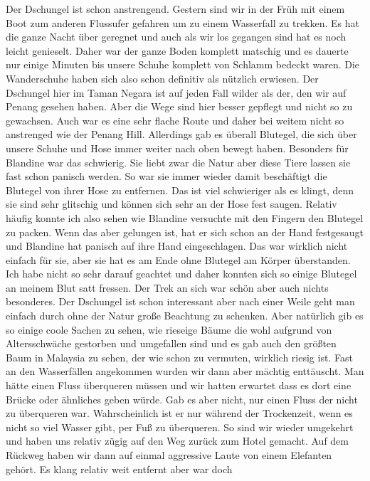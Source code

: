 \documentclass[11pt]{book}
\begin{document}
Der Dschungel ist schon anstrengend. Gestern sind wir in der Früh mit einem Boot zum anderen Flussufer gefahren um zu einem Wasserfall 
zu trekken. Es hat die ganze Nacht über geregnet und auch als wir los gegangen sind hat es noch leicht genieselt. Daher war der ganze 
Boden komplett matschig und es dauerte nur einige Minuten bis unsere Schuhe komplett von Schlamm bedeckt waren. Die Wanderschuhe 
haben sich also schon definitiv als nützlich erwiesen. Der Dschungel hier im Taman Negara ist auf jeden Fall wilder als der, den
wir auf Penang gesehen haben. Aber die Wege sind hier besser gepflegt und nicht so zu gewachsen. Auch war es eine sehr flache Route 
und daher bei weitem nicht so anstrenged wie der Penang Hill. Allerdings gab es überall Blutegel, die sich über unsere Schuhe und Hose 
immer weiter nach oben bewegt haben. Besonders für Blandine war das schwierig. Sie liebt zwar die Natur aber diese Tiere lassen 
sie fast schon panisch werden. So war sie immer wieder damit beschäftigt die Blutegel von ihrer Hose zu entfernen. Das ist viel 
schwieriger als es klingt, denn sie sind sehr glitschig und können sich sehr an der Hose fest saugen. Relativ häufig konnte ich also 
sehen wie Blandine versuchte mit den Fingern den Blutegel zu packen. Wenn das aber gelungen ist, hat er sich schon an der Hand 
festgesaugt und Blandine hat panisch auf ihre Hand eingeschlagen. Das war wirklich nicht einfach für sie, aber sie hat es am Ende 
ohne Blutegel am Körper überstanden. Ich habe nicht so sehr darauf geachtet und daher konnten sich so einige Blutegel an meinem 
Blut satt fressen. Der Trek an sich war schön aber auch nichts besonderes. Der Dschungel ist schon interessant aber nach einer Weile 
geht man einfach durch ohne der Natur große Beachtung zu schenken. Aber natürlich gib es so einige coole Sachen zu sehen, wie rieseige 
Bäume die wohl aufgrund von Altersschwäche gestorben und umgefallen sind und es gab auch den größten Baum in Malaysia zu sehen, der 
wie schon zu vermuten, wirklich riesig ist. Fast an den Wasserfällen angekommen wurden wir dann aber mächtig enttäuscht. Man hätte 
einen Fluss überqueren müssen und wir hatten erwartet dass es dort eine Brücke oder ähnliches geben würde. Gab es aber nicht, 
nur einen Fluss der nicht zu überqueren war. Wahrscheinlich ist er nur während der Trockenzeit, wenn es nicht so viel Wasser gibt, 
per Fuß zu überqueren. So sind wir wieder umgekehrt und haben uns relativ zügig auf den Weg zurück zum Hotel gemacht. Auf dem 
Rückweg haben wir dann auf einmal aggressive Laute von einem Elefanten gehört. Es klang relativ weit entfernt aber war doch 
\end{document}

